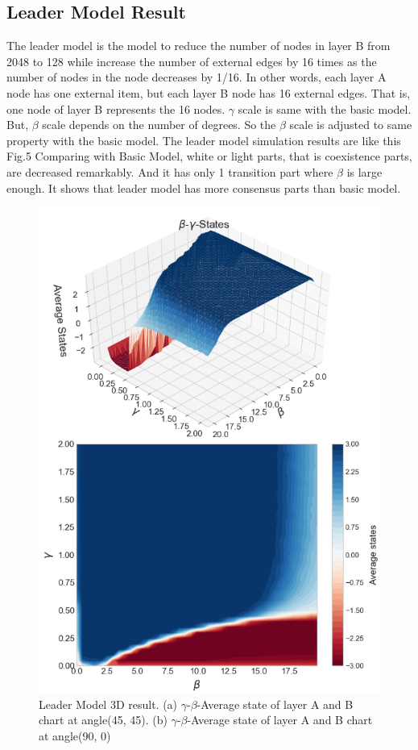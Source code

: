 \documentclass[english]{cccconf}
\begin{document}
\subsection{Leader Model Result}
 The leader model is the model to reduce the number of nodes in layer B from 2048 to 128 while increase the number of external edges by 16 times as the number of nodes in the node decreases by 1/16.  In other words, each layer A node has one external item, but each layer B node has 16 external edges. That is, one node of layer B represents the 16 nodes. $\gamma$ scale is same with the basic model. But, $\beta$ scale depends on the number of degrees. So the $\beta$ scale is adjusted to same property with the basic model. 
The leader model simulation results are like this Fig.5
Comparing with Basic Model, white or light parts, that is coexistence parts, are decreased remarkably. And it has only 1 transition part where $\beta$ is large enough. It shows that leader model has more consensus parts than basic model.
\begin{figure}[!htb]
  \centering
  \includegraphics[width=\hsize]{FIG5.png}
  \caption{Leader Model 3D result. (a) $\gamma$-$\beta$-Average state of layer A and B chart at angle(45, 45). (b) $\gamma$-$\beta$-Average state of layer A and B chart at angle(90, 0)}
  \label{Fig5}
\end{figure}
\end{document}
